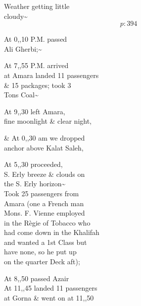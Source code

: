 \documentclass{report}
\begin{document}
	\par{
 	Weather getting little\ \\cloudy\~{}\ \\
  \[p: 394 \]

	}



	\par{
 	At 0,,10 P.M. passed\ \\Ali Gherbi;\~{}\ \\
	}

	\par{
 	At 7,,55 P.M. arrived\ \\at Amara landed 11 passengers\ \\\& 15 packages; took 3\ \\Tons Coal\~{}\ \\
	}

	\par{
 	At 9,,30 left Amara,\ \\fine moonlight \& clear night,\ \\
	}

	\par{
 	\& At 0,,30 am we dropped\ \\anchor above Kalat Saleh,\ \\
	}

	\par{
 	At 5,,30 proceeded,\ \\S. Erly breeze \& clouds on\ \\the S. Erly horizon\~{}\ \\Took 25 passengers from\ \\Amara (one a French man\ \\Mons. F. Vienne employed\ \\in the Règie of Tobacco who\ \\had come down in the Khalifah\ \\and wanted a 1st Class but\ \\have none, so he put up\ \\on the quarter Deck aft);\ \\
	}

	\par{
 	At 8,,50 passed Azair\ \\At 11,,45 landed 11 passengers\ \\at Gorna \& went on at 11,,50\ \\
	}
\end{document}
